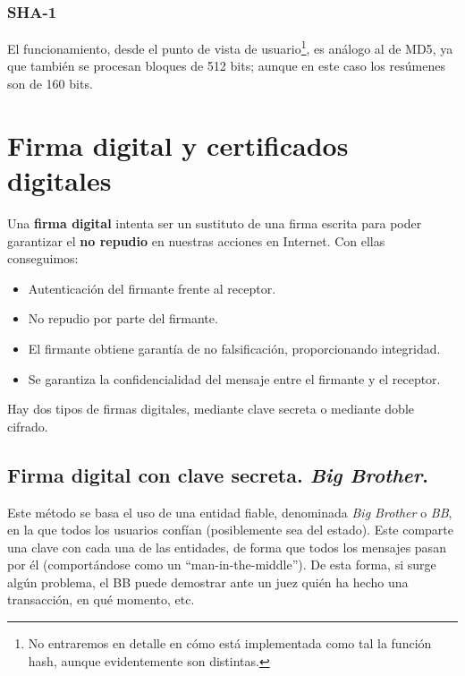 \subsubsection{\acrfull{SHA-1}}

El funcionamiento, desde el punto de vista de usuario\footnote{No entraremos en detalle en cómo está implementada como tal la función hash, aunque evidentemente son distintas.}, es análogo al de \acrshort{MD5}, ya que también se procesan bloques de 512 bits; aunque en este caso los resúmenes son de 160 bits.


\section{Firma digital y certificados digitales}

Una \textbf{firma digital} intenta ser un sustituto de una firma escrita para poder garantizar el \textbf{no repudio} en nuestras acciones en Internet. Con ellas conseguimos:
\begin{itemize}
    \item Autenticación del firmante frente al receptor.
    \item No repudio por parte del firmante.
    \item El firmante obtiene garantía de no falsificación, proporcionando integridad.
    \item Se garantiza la confidencialidad del mensaje entre el firmante y el receptor.
\end{itemize}

Hay dos tipos de firmas digitales, mediante clave secreta o mediante doble cifrado.
\subsection{Firma digital con clave secreta. \emph{Big Brother}.}

Este método se basa el uso de una entidad fiable, denominada \emph{Big Brother} o \emph{BB}, en la que todos los usuarios confían (posiblemente sea del estado). Este comparte una clave con cada una de las entidades, de forma que todos los mensajes pasan por él (comportándose como un ``man-in-the-middle''). De esta forma, si surge algún problema, el BB puede demostrar ante un juez quién ha hecho una transacción, en qué momento, etc.

